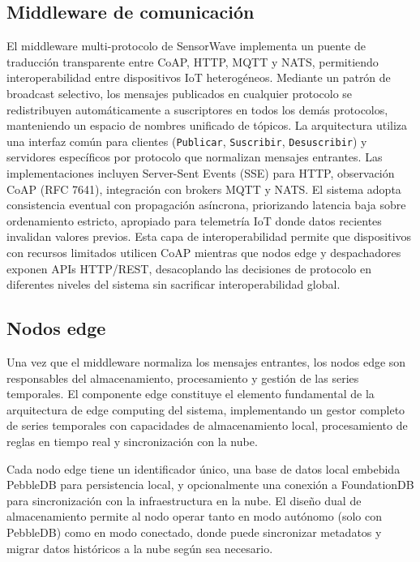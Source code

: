 \subsection{Middleware de comunicación}

El middleware multi-protocolo de SensorWave implementa un puente de traducción transparente entre CoAP, HTTP, MQTT y NATS, permitiendo interoperabilidad entre dispositivos IoT heterogéneos. Mediante un patrón de broadcast selectivo, los mensajes publicados en cualquier protocolo se redistribuyen automáticamente a suscriptores en todos los demás protocolos, manteniendo un espacio de nombres unificado de tópicos. La arquitectura utiliza una interfaz común para clientes (\texttt{Publicar}, \texttt{Suscribir}, \texttt{Desuscribir}) y servidores específicos por protocolo que normalizan mensajes entrantes. Las implementaciones incluyen Server-Sent Events (SSE) para HTTP, observación CoAP (RFC 7641), integración con brokers MQTT y NATS. El sistema adopta consistencia eventual con propagación asíncrona, priorizando latencia baja sobre ordenamiento estricto, apropiado para telemetría IoT donde datos recientes invalidan valores previos. Esta capa de interoperabilidad permite que dispositivos con recursos limitados utilicen CoAP mientras que nodos edge y despachadores exponen APIs HTTP/REST, desacoplando las decisiones de protocolo en diferentes niveles del sistema sin sacrificar interoperabilidad global.

\subsection{Nodos edge}

Una vez que el middleware normaliza los mensajes entrantes, los nodos edge son responsables del almacenamiento, procesamiento y gestión de las series temporales. El componente edge constituye el elemento fundamental de la arquitectura de edge computing del sistema, implementando un gestor completo de series temporales con capacidades de almacenamiento local, procesamiento de reglas en tiempo real y sincronización con la nube.

Cada nodo edge tiene un identificador único, una base de datos local embebida PebbleDB para persistencia local, y opcionalmente una conexión a FoundationDB para sincronización con la infraestructura en la nube. El diseño dual de almacenamiento permite al nodo operar tanto en modo autónomo (solo con PebbleDB) como en modo conectado, donde puede sincronizar metadatos y migrar datos históricos a la nube según sea necesario.

